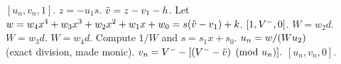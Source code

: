 \begin{algorithm}[htbp]
\begin{algorithmic} [1]
        \State \Return $[u_n,v_n,1]$.
    \EndIf
\EndIf
\State $z = -u_1s$.
\State $\tilde{v} = z - v_1 - h$.
\State Let $w = w_4x^4 + w_3x^3 + w_2x^2 + w_1x + w_0 = s(\tilde{v} - v_1) + k$.
         \Return $[1,V^{-},0]$.
        \Else \hspace{3pt} $W = w_2d$.
        \EndIf
    \Else \hspace{3pt} $W = w_3d$.
    \EndIf
\Else \hspace{3pt} $W = w_4d$.
\EndIf
\State Compute $1/W$ and $s = s_1x + s_0$.
\State $u_n = w/(Wu_2) \quad\quad\quad$ (exact division, made monic).
\State $v_n = V^{-} - [(V^{-} - \tilde{v}) \pmod{u_n}].$ 
\State \Return $[u_n,v_n,0]$.
\vspace{-2pt}
\end{algorithmic}
\end{algorithm}




